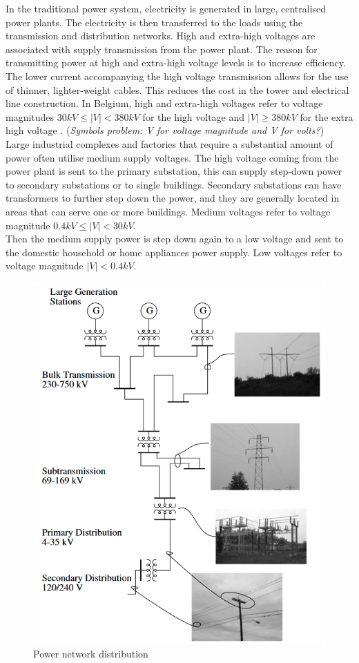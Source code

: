 In the traditional power system, electricity is generated in large, centralised power plants. The electricity is then transferred to the loads using the transmission and distribution networks. High and extra-high voltages are associated with supply transmission from the power plant. The reason for transmitting power at high and extra-high voltage levels is to increase efficiency. The lower current accompanying the high voltage transmission allows for the use of thinner, lighter-weight cables. This reduces the cost in the tower and electrical line construction. In Belgium, high and extra-high voltages refer to voltage magnitudes $30 kV \leq |V| < 380 kV$ for the high voltage and $|V| \geq 380 kV$ for the extra high voltage \cite{elia}. (\emph{Symbols problem: V for voltage magnitude and V for volts?})\\
Large industrial complexes and factories that require a substantial amount of power often utilise medium supply voltages. The high voltage coming from the power plant is sent to the primary substation, this can supply step-down power to secondary substations or to single buildings. Secondary substations can have transformers to further step down the power, and they are generally located in areas that can serve one or more buildings. Medium voltages refer to voltage magnitude $0.4 kV \leq |V| < 30 kV$. \\
Then the medium supply power is step down again to a low voltage and sent to the domestic household or home appliances power supply. Low voltages refer to voltage magnitude $|V| < 0.4 kV$. \\
\begin{figure}[H]
\centering
    \includegraphics[width=.25\linewidth]{images/Background/DN/DN.PNG}
\caption[Power network distribution]{Power network distribution \cite{EPD}}
\end{figure}


